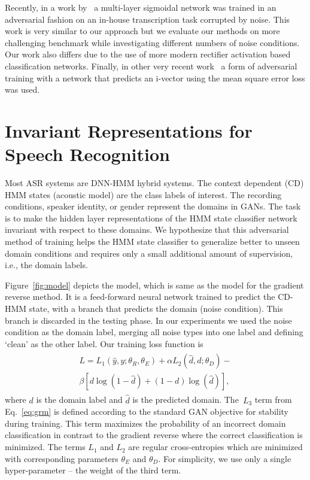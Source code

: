 \documentclass[a4paper]{article}
\begin{document}
    Recently, in a work by~\cite{yusuke2016adversarial} a multi-layer sigmoidal network was trained 
    in an adversarial fashion on an in-house transcription task corrupted by noise.
    This work is very similar to our approach but we evaluate our methods on
    more challenging benchmark while investigating different numbers of noise
    conditions. Our work also differs due to the use of more modern rectifier
    activation based classification networks.
    Finally, in other very recent work~\citep{saon2017english} a form of adversarial training with a network
    that predicts an i-vector using the mean square error loss was used.

\section{Invariant Representations for Speech Recognition}
\label{sec:invariant-speech}

Most ASR systems are DNN-HMM hybrid systems. The context dependent (CD) HMM 
states (acoustic model) are the class labels of interest. The
recording conditions, speaker identity, or gender represent the domains in 
GANs. The task is to make the hidden layer representations of the HMM state classifier network 
invariant with respect to these domains. We hypothesize that this adversarial method of
training helps the HMM state classifier to generalize better to unseen domain conditions and requires only a  
small additional amount of supervision, i.e., the domain labels.  

Figure~\ref{fig:model} depicts the model, which is same as the model for the 
gradient reverse method. It is a feed-forward neural network trained to predict 
the CD-HMM state, with a branch that predicts the domain (noise condition). This 
branch is discarded in the testing phase. In our experiments we
used the noise condition as the domain label, merging all noise types into one label
and defining `clean' as the other label. Our training loss function is  
\begin{align}
    \begin{split}
    L = L_1(\hat{y}, y; \theta_R, \theta_E) + 
    \alpha L_2(\hat{d}, d; \theta_D) -\\
    \beta [d\log(1 - \hat{d}) + (1-d)\log(\hat{d})],
    \end{split}
    \label{eq:our}
\end{align}
where $d$ is the domain label and $\hat{d}$ is the predicted domain.
The~$L_3$ term from Eq.~\ref{eq:grm} is defined according to the standard GAN
objective for stability during training. 
This term maximizes the probability
of an incorrect domain classification in contrast to the gradient reverse where the 
correct classification is minimized.
The terms $L_1$ and $L_2$ are 
regular cross-entropies which are minimized with corresponding parameters $\theta_E$ and $\theta_D$.
For simplicity, we use only a single hyper-parameter -- the weight of the third term.
\end{document}
